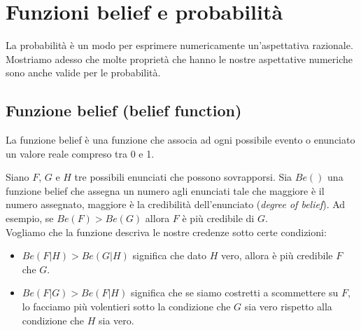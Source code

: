 \documentclass[../main.tex]{subfiles}
\begin{document}
\section{Funzioni belief e probabilità}
La probabilità è un modo per esprimere numericamente un'aspettativa razionale.
Mostriamo adesso che molte proprietà che hanno le nostre aspettative numeriche sono anche valide per le probabilità.
\subsection{Funzione belief (belief function)}
\begin{definition}
    \label{def:funzione_belief}
    La funzione belief è una funzione che associa ad ogni possibile evento o enunciato un valore reale compreso tra 0 e 1.
\end{definition}
\hfill \break
Siano $F$, $G$ e $H$ tre possibili enunciati che possono sovrapporsi.
Sia $Be()$ una funzione belief che assegna un numero agli enunciati tale che maggiore è il numero assegnato, maggiore è la credibilità dell'enunciato (\textit{degree of belief}).
Ad esempio, se $Be(F) > Be(G)$ allora $F$ è più credibile di $G$.\\
Vogliamo che la funzione descriva le nostre credenze sotto certe condizioni:
\begin{itemize}
    \item $Be(F|H) > Be(G|H)$ significa che dato $H$ vero, allora è più credibile $F$ che $G$.
    \item $Be(F|G) > Be(F|H)$ significa che se siamo costretti a scommettere su $F$, lo facciamo più volentieri sotto la condizione che $G$ sia vero rispetto alla condizione che $H$ sia vero.
\end{itemize}
\end{document}

